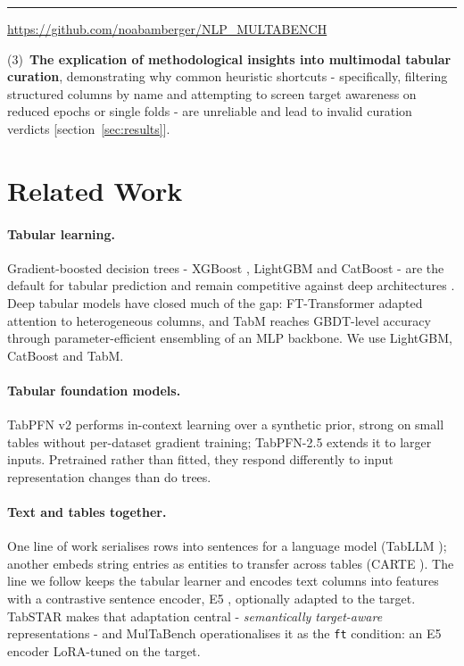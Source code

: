 \documentclass{article}
\begin{document}
\noindent
\begin{minipage}{\linewidth}
\rule{0.45\linewidth}{0.4pt}

\vspace{2pt}

{\footnotesize
\url{https://github.com/noabamberger/NLP_MULTABENCH}
}
\end{minipage}

\newpage

(3)~\textbf{The explication of methodological insights into multimodal tabular curation}, demonstrating why common heuristic shortcuts - specifically, filtering structured columns by name and attempting to screen target awareness on reduced epochs or single folds - are unreliable and lead to invalid curation verdicts [section~\ref{sec:results}].






\section{Related Work}

\paragraph{Tabular learning.} Gradient-boosted decision trees - XGBoost \cite{xgboost},
LightGBM \cite{lightgbm} and CatBoost \cite{catboost} - are the default for tabular
prediction and remain competitive against deep architectures \cite{grinsztajn,shwartzziv}. Deep
tabular models have closed much of the gap: FT-Transformer \cite{fttransformer} adapted
attention to heterogeneous columns, and TabM \cite{tabm} reaches GBDT-level accuracy through
parameter-efficient ensembling of an MLP backbone. We use LightGBM, CatBoost and TabM.

\paragraph{Tabular foundation models.} TabPFN v2 \cite{tabpfnv2} performs in-context learning
over a synthetic prior, strong on small tables without per-dataset gradient training;
TabPFN-2.5 \cite{tabpfn25} extends it to larger inputs. Pretrained rather than fitted,
they respond differently to input representation changes than do trees.

\paragraph{Text and tables together.} One line of work serialises rows into sentences for a
language model (TabLLM \cite{tabllm}); another embeds string entries as entities to transfer
across tables (CARTE \cite{carte}). The line we follow keeps the tabular learner and encodes
text columns into features with a contrastive sentence encoder, E5 \cite{e5}, optionally
adapted to the target. TabSTAR \cite{tabstar} makes that adaptation central -
\emph{semantically target-aware} representations - and MulTaBench operationalises it as the
\texttt{ft} condition: an E5 encoder LoRA-tuned \cite{lora} on the target.
\end{document}
